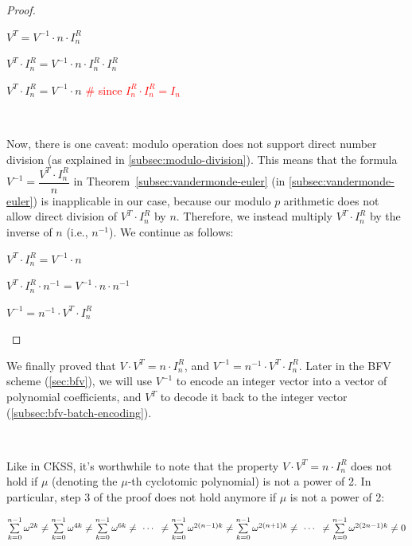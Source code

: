 \begin{proof}
\begin{enumerate}
$V^T = V^{-1} \cdot n \cdot I_n^R$

$V^T \cdot I_n^R = V^{-1} \cdot n \cdot I_n^R  \cdot I_n^R$

$V^T \cdot I_n^R = V^{-1} \cdot n$ \textcolor{red}{\text{ } \# since $I_n^R  \cdot I_n^R = I_n$}

$ $

Now, there is one caveat: modulo operation does not support direct number division (as explained in \autoref{subsec:modulo-division}). This means that the formula $V^{-1} = \dfrac{V^T \cdot I_n^R}{n}$ in Theorem~\ref*{subsec:vandermonde-euler} (in \autoref{subsec:vandermonde-euler}) is inapplicable in our case, because our modulo $p$ arithmetic does not allow direct division of $V^T \cdot I_n^R$ by $n$. Therefore, we instead multiply $V^T \cdot I_n^R$ by the inverse of $n$ (i.e., $n^{-1}$). We continue as follows:

$V^T \cdot I_n^R = V^{-1} \cdot n$

$V^T \cdot I_n^R \cdot n^{-1}= V^{-1} \cdot n \cdot n^{-1}$

$V^{-1} = n^{-1}\cdot V^T \cdot I_n^R$

\end{enumerate}
\end{proof}

We finally proved that $V\cdot V^T = n \cdot I_n^R$, and $V^{-1} = n^{-1}\cdot V^T \cdot I_n^R$. Later in the BFV scheme (\autoref{sec:bfv}), we will use $V^{-1}$ to encode an integer vector into a vector of polynomial coefficients, and $V^T$ to decode it back to the integer vector (\autoref{subsec:bfv-batch-encoding}).

$ $

 Like in CKSS, it's worthwhile to note that the property $V\cdot V^T = n\cdot I_n^R$ does not hold if $\mu$ (denoting the $\mu$-th cyclotomic polynomial) is not a power of 2. In particular, step 3 of the proof does not hold anymore if $\mu$ is not a power of 2:

$\sum\limits_{k=0}^{n-1} \omega^{2k} \neq \sum\limits_{k=0}^{n-1} \omega^{4k} \neq \sum\limits_{k=0}^{n-1} \omega^{6k} \neq \text{ } \text{$\cdots$} \text{ } \neq \sum\limits_{k=0}^{n-1} \omega^{2(n-1)k} \neq \sum\limits_{k=0}^{n-1} \omega^{2(n+1)k} \neq \text{ } \text{$\cdots$} \text{ } \neq \sum\limits_{k=0}^{n-1} \omega^{2(2n-1)k} \neq 0$